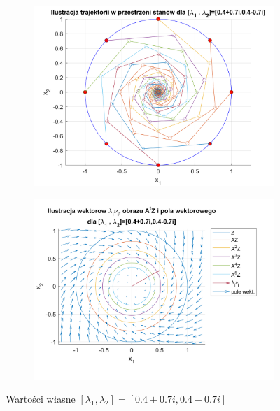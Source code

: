 \documentclass{article}
\begin{document}
\begin{figure}[H]
    \centering
    \begin{subfigure}{0.44\textwidth}
        \includegraphics[width=\textwidth]{portret_fazowy_4+7i_4-7i.png}
    \end{subfigure}
    \begin{subfigure}{0.48\textwidth}
        \includegraphics[width=\textwidth]{pole_wektorowe_4+7i_4-7i.png}
    \end{subfigure}
    \caption{Warto\'sci własne $[ \lambda_1, \lambda_2 ]= [ 0.4+0.7i, 0.4-0.7i ]$}
    \label{fig::47ii4-7}
\end{figure}
\end{document}

